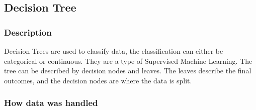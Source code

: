 \documentclass[12pt]{article}
\begin{document}
	\subsection{Decision Tree}
	\subsubsection{Description}
	
	Decision Trees are used to classify data, the classification can either be categorical or continuous. They are a type of Supervised Machine Learning. The tree can be described by decision nodes and leaves. The leaves describe the final outcomes, and the decision nodes are where the data is split\cite{decision-tree-explanation}.
	
	\subsubsection{How data was handled}
	
\end{document}
